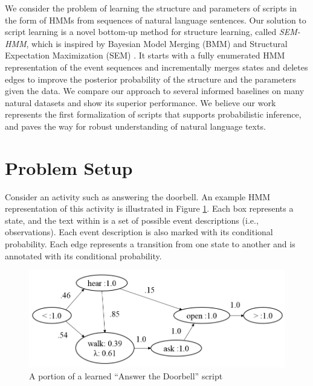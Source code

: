 \documentclass[letterpaper]{article}
\begin{document}
We consider the problem of learning the structure and parameters of scripts in the form of HMMs from sequences of natural language sentences. Our solution to script learning is a novel bottom-up method for structure learning, called {\em SEM-HMM}, which is inspired by Bayesian Model Merging (BMM) \cite{stolcke1994best} and Structural Expectation Maximization (SEM)  \cite{friedman1998bayesian}. It starts with a fully enumerated HMM representation of the event sequences and incrementally merges states and deletes edges to improve the posterior probability of the structure and the parameters given the data. We compare our approach to several informed baselines on many natural datasets and show its superior performance. We believe our work represents the first formalization of scripts that supports probabilistic inference, and paves the way for robust understanding of natural language texts.

\section{Problem Setup}

Consider an activity such as answering the doorbell.  An example HMM representation of this activity is illustrated in Figure \ref{fig:dbscript}.  Each box represents a state, and the text within is a set of possible event descriptions (i.e., observations). Each event description is also marked with its conditional probability.  %
Each edge represents a transition from one state to another and is annotated with its conditional probability.

\begin{figure}
\centering
	\includegraphics[scale=.35]{pretty.png}
\caption{A portion of a learned ``Answer the Doorbell'' script}
\label{fig:dbscript}
\end{figure}
\end{document}
